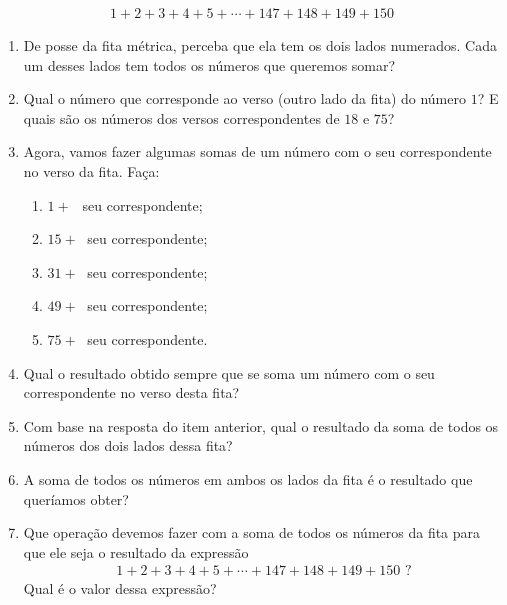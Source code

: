 \documentclass[10 pt,usenames,dvipsnames, oneside]{article}
\begin{document}
\begin{equation*}
\begin{split}1+2+3+4+5+ \cdots +147+148+149+150\end{split}
\end{equation*}\begin{enumerate}
\item {} 
De posse da fita métrica, perceba que ela tem os dois lados numerados. Cada um desses lados tem todos os números que queremos somar?

\item {} 
Qual o número que corresponde ao verso (outro lado da fita) do número \(1\)? E quais são os números dos versos correspondentes de \(18\) e \(75\)?

\item {} 
Agora, vamos fazer algumas somas de um número com o seu correspondente no verso da fita. Faça:

\begin{enumerate}[label=\Roman*)]
\item \(1 + \,\;\) seu correspondente;

\item \(15 + \;\) seu correspondente;

\item \(31 + \;\) seu correspondente;

\item \(49 + \;\) seu correspondente;

\item \(75 + \;\) seu correspondente.
\end{enumerate}

\item {} 
Qual o resultado obtido sempre que se soma um número com o seu correspondente no verso desta fita?

\item {} 
Com base na resposta do item anterior, qual o resultado da soma de todos os números dos dois lados dessa fita?

\item {} 
A soma de todos os números em ambos os lados da fita é o resultado que queríamos obter?

\item {} 
Que operação devemos fazer com a soma de todos os números da fita para que ele seja o resultado da expressão
\begin{equation*}
\begin{split}1+2+3+4+5+ \cdots +147+148+149+150 \text{ ?}\end{split}
\end{equation*}
Qual é o valor dessa expressão?


\end{enumerate}
\end{document}
